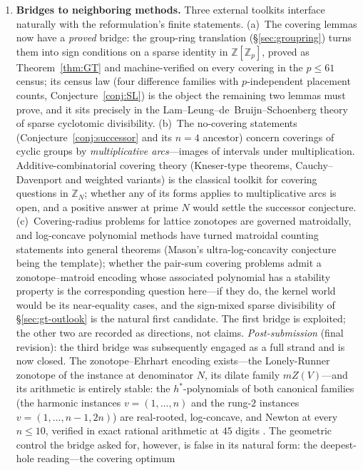 \documentclass[11pt,a4paper]{article}
\numberwithin{equation}{section}
\theoremstyle{plain}
\theoremstyle{definition}
\theoremstyle{remark}
\newcommand{\Z}{\mathbb{Z}}
\begin{document}
\begin{enumerate}[leftmargin=1.7em,itemsep=4pt]
\item \textbf{Bridges to neighboring methods.} Three external toolkits
  interface naturally with the reformulation's finite statements.
  (a)~The covering lemmas now have a \emph{proved} bridge: the group-ring
  translation (\S\ref{sec:groupring}) turns them into sign conditions on
  a sparse identity in $\Z[\Z_p]$, proved as Theorem~\ref{thm:GT} and
  machine-verified on every covering in the $p\le61$ census; its census
  law (four difference families with $p$-independent placement counts,
  Conjecture~\ref{conj:SL}) is the object the remaining two lemmas must
  prove, and it sits precisely in the Lam--Leung--de~Bruijn--Schoenberg
  theory of sparse cyclotomic divisibility.
  (b)~The no-covering
  statements (Conjecture~\ref{conj:successor} and its $n=4$ ancestor)
  concern coverings of cyclic groups by \emph{multiplicative
  arcs}---images of intervals under multiplication. Additive-combinatorial
  covering theory (Kneser-type theorems, Cauchy--Davenport and weighted
  variants) is the classical toolkit for covering questions in $\Z_N$;
  whether any of its forms applies to multiplicative arcs is open, and a
  positive answer at prime $N$ would settle the successor conjecture.
  (c)~Covering-radius problems for lattice zonotopes are governed
  matroidally, and log-concave polynomial methods have turned matroidal
  counting statements into general theorems (Mason's ultra-log-concavity
  conjecture being the template); whether the pair-sum covering problems
  admit a zonotope--matroid encoding whose associated polynomial has a
  stability property is the corresponding question here---if they do, the
  kernel world would be its near-equality cases, and the sign-mixed
  sparse divisibility of \S\ref{sec:gt-outlook} is the natural first
  candidate. The first bridge is exploited; the other two are recorded as
  directions, not claims. \emph{Post-submission} (final revision): the
  third bridge was subsequently engaged as a full strand and is now
  closed. The zonotope--Ehrhart encoding exists---the Lonely-Runner
  zonotope of the instance at denominator $N$, its dilate family
  $mZ(V)$---and its arithmetic is entirely stable: the $h^*$-polynomials
  of both canonical families (the harmonic instances $v=(1,\dots,n)$ and
  the rung-$2$ instances $v=(1,\dots,n{-}1,2n)$) are real-rooted,
  log-concave, and Newton at every $n\le 10$, verified in exact
  rational arithmetic at $45$ digits \cite{companion-paper}. The
  geometric control the bridge asked for, however, is false in its
  natural form: the deepest-hole reading---the covering optimum

\end{enumerate}
\end{document}
